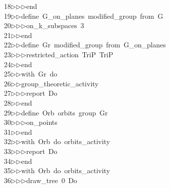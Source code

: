 \begin{tabbing}
18\>$\triangleright$\>$\triangleright$\>$\triangleright$\>end\ \\[0pt]
19\>$\triangleright$\>$\triangleright$\>define\ G\_on\_planes\ modified\_group\ from\ G\ \\[0pt]
20\>$\triangleright$\>$\triangleright$\>$\triangleright$\>on\_k\_subspaces\ 3\ \\[0pt]
21\>$\triangleright$\>$\triangleright$\>end\ \\[0pt]
22\>$\triangleright$\>$\triangleright$\>define\ Gr\ modified\_group\ from\ G\_on\_planes\ \\[0pt]
23\>$\triangleright$\>$\triangleright$\>$\triangleright$\>restricted\_action\ TriP\ TriP\ \\[0pt]
24\>$\triangleright$\>$\triangleright$\>end\ \\[0pt]
25\>$\triangleright$\>$\triangleright$\>with\ Gr\ do\ \\[0pt]
26\>$\triangleright$\>$\triangleright$\>group\_theoretic\_activity\ \\[0pt]
27\>$\triangleright$\>$\triangleright$\>$\triangleright$\>report\ Do\ \\[0pt]
28\>$\triangleright$\>$\triangleright$\>end\ \\[0pt]
29\>$\triangleright$\>$\triangleright$\>define\ Orb\ orbits\ group\ Gr\ \\[0pt]
30\>$\triangleright$\>$\triangleright$\>$\triangleright$\>on\_points\ \\[0pt]
31\>$\triangleright$\>$\triangleright$\>end\ \\[0pt]
32\>$\triangleright$\>$\triangleright$\>with\ Orb\ do\ orbits\_activity\ \\[0pt]
33\>$\triangleright$\>$\triangleright$\>$\triangleright$\>report\ Do\ \\[0pt]
34\>$\triangleright$\>$\triangleright$\>end\ \\[0pt]
35\>$\triangleright$\>$\triangleright$\>with\ Orb\ do\ orbits\_activity\ \\[0pt]
36\>$\triangleright$\>$\triangleright$\>$\triangleright$\>draw\_tree\ 0\ Do\ \\[0pt]

\end{tabbing}
